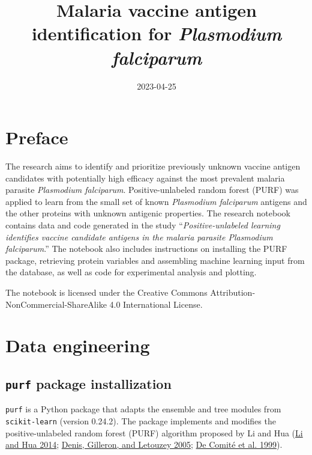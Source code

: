\documentclass[
  11pt,
  oneside]{book}
\title{Malaria vaccine antigen identification for \emph{Plasmodium falciparum}}
\author{}
\date{\vspace{-2.5em}2023-04-25}
\begin{document}
\maketitle

{
\hypersetup{linkcolor=}
\setcounter{tocdepth}{2}
\tableofcontents
}
\mainmatter

\hypertarget{preface}{%
\chapter*{Preface}\label{preface}}

The research aims to identify and prioritize previously unknown vaccine antigen candidates with potentially high efficacy against the most prevalent malaria parasite \emph{Plasmodium falciparum}. Positive-unlabeled random forest (PURF) was applied to learn from the small set of known \emph{Plasmodium falciparum} antigens and the other proteins with unknown antigenic properties. The research notebook contains data and code generated in the study ``\emph{Positive-unlabeled learning identifies vaccine candidate antigens in the malaria parasite Plasmodium falciparum}.'' The notebook also includes instructions on installing the PURF package, retrieving protein variables and assembling machine learning input from the database, as well as code for experimental analysis and plotting.

The notebook is licensed under the Creative Commons Attribution-NonCommercial-ShareAlike 4.0 International License.

\hypertarget{01_data_engineering}{%
\chapter{Data engineering}\label{01_data_engineering}}

\hypertarget{purf-package-installization}{%
\section{\texorpdfstring{\texttt{purf} package installization}{purf package installization}}\label{purf-package-installization}}

\texttt{purf} is a Python package that adapts the ensemble and tree modules from \texttt{scikit-learn} (version 0.24.2). The package implements and modifies the positive-unlabeled random forest (PURF) algorithm proposed by Li and Hua (\protect\hyperlink{ref-li2014towards}{Li and Hua 2014}; \protect\hyperlink{ref-denis2005learning}{Denis, Gilleron, and Letouzey 2005}; \protect\hyperlink{ref-de1999positive}{De Comité et al. 1999}).
\end{document}

